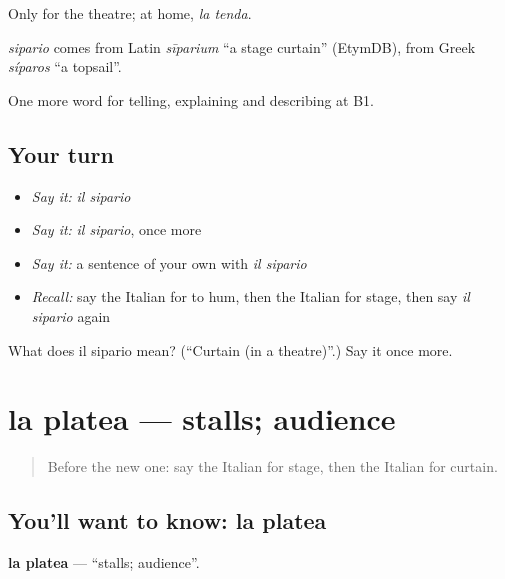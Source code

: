 Only for the theatre; at home, \emph{la tenda}.

\begin{cousinweb}
\emph{sipario} comes from Latin \emph{sīparium} \textquotedblleft{}a stage curtain\textquotedblright{} (EtymDB), from Greek \emph{síparos} \textquotedblleft{}a topsail\textquotedblright{}.
\end{cousinweb}

\begin{grammarlens}[title={What you've built}]
One more word for telling, explaining and describing at B1.
\end{grammarlens}

\subsection*{Your turn}
\begin{itemize}
\raggedright
  \item \emph{Say it:} \emph{il sipario}
  \item \emph{Say it:} \emph{il sipario}, once more
  \item \emph{Say it:} a sentence of your own with \emph{il sipario}
  \item \emph{Recall:} say the Italian for to hum, then the Italian for stage, then say \emph{il sipario} again
\end{itemize}

\begin{tcolorbox}[breakable,colback=teal!4,colframe=teal!35!black,title={Before you move on}]
What does il sipario mean? (\textquotedblleft{}Curtain (in a theatre)\textquotedblright{}.) Say it once more.
\end{tcolorbox}
\section[la platea]{la platea — stalls; audience}

\label{lesson:IT-C519-platea}



\begin{quote}
Before the new one: say the Italian for stage, then the Italian for curtain.
\end{quote}

\subsection*{You'll want to know: la platea}
\textbf{la platea} — \textquotedblleft{}stalls; audience\textquotedblright{}.

